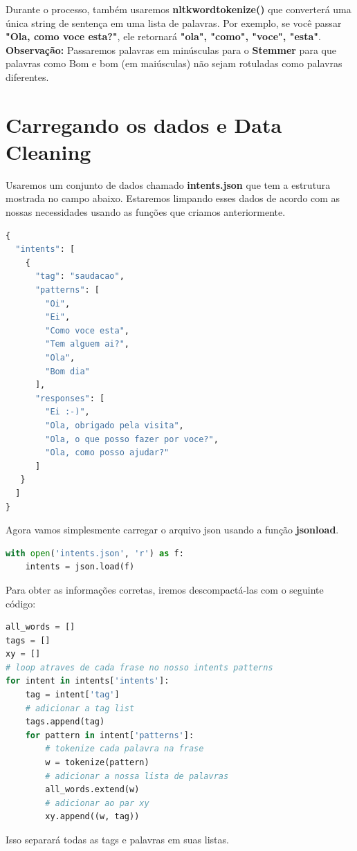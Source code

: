 Durante o processo, também usaremos \textbf{nltkwordtokenize()} que converterá uma única string de sentença em uma lista de palavras. Por exemplo, se você passar \textbf{"Ola, como voce esta?"}, ele retornará \textbf{"ola", "como", "voce", "esta"}.
\textbf{Observação:} Passaremos palavras em minúsculas para o \textbf{Stemmer} para que palavras como Bom e bom (em maiúsculas) não sejam rotuladas como palavras diferentes.

\section[Carregando os dados e Data Cleaning]{Carregando os dados e Data Cleaning}
Usaremos um conjunto de dados chamado  \textbf{intents.json} que tem a estrutura mostrada no campo abaixo. Estaremos limpando esses dados de acordo com as nossas necessidades usando as funções que criamos anteriormente.

\begin{lstlisting}[language=python, caption=Data intents.json]
{
  "intents": [
    {
      "tag": "saudacao",
      "patterns": [
        "Oi",
        "Ei",
        "Como voce esta",
        "Tem alguem ai?",
        "Ola",
        "Bom dia"
      ],
      "responses": [
        "Ei :-)",
        "Ola, obrigado pela visita",
        "Ola, o que posso fazer por voce?",
        "Ola, como posso ajudar?"
      ]
   }
  ]
}


\end{lstlisting}
Agora vamos simplesmente carregar o arquivo json usando a função \textbf{jsonload}.

\begin{lstlisting}[language=Python, caption=Python Carregando dados]
with open('intents.json', 'r') as f:
    intents = json.load(f)
\end{lstlisting}

Para obter as informações corretas, iremos descompactá-las com o seguinte código:

\begin{lstlisting}[language=Python, caption=Python Loop nos dados]
all_words = []
tags = []
xy = []
# loop atraves de cada frase no nosso intents patterns
for intent in intents['intents']:
    tag = intent['tag']
    # adicionar a tag list
    tags.append(tag)
    for pattern in intent['patterns']:
        # tokenize cada palavra na frase
        w = tokenize(pattern)
        # adicionar a nossa lista de palavras
        all_words.extend(w)
        # adicionar ao par xy
        xy.append((w, tag))

\end{lstlisting}
Isso separará todas as tags e palavras em suas listas.

